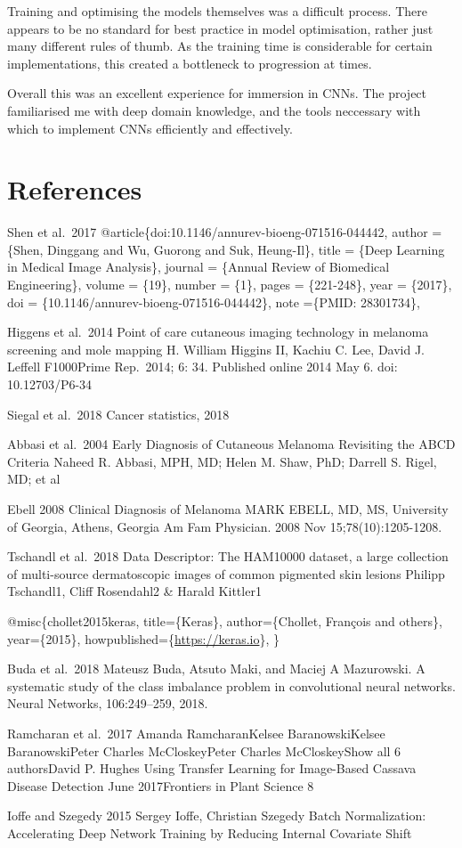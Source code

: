 \documentclass[11pt]{article}
\begin{document}
Training and optimising the models themselves was a difficult process.
There appears to be no standard for best practice in model optimisation,
rather just many different rules of thumb. As the training time is
considerable for certain implementations, this created a bottleneck to
progression at times.

Overall this was an excellent experience for immersion in CNNs. The
project familiarised me with deep domain knowledge, and the tools
neccessary with which to implement CNNs efficiently and effectively.

    \hypertarget{references}{%
\section{References}\label{references}}

Shen et al.~2017 @article\{doi:10.1146/annurev-bioeng-071516-044442,
author = \{Shen, Dinggang and Wu, Guorong and Suk, Heung-Il\}, title =
\{Deep Learning in Medical Image Analysis\}, journal = \{Annual Review
of Biomedical Engineering\}, volume = \{19\}, number = \{1\}, pages =
\{221-248\}, year = \{2017\}, doi =
\{10.1146/annurev-bioeng-071516-044442\}, note =\{PMID: 28301734\},

Higgens et al.~2014 Point of care cutaneous imaging technology in
melanoma screening and mole mapping H. William Higgins II, Kachiu C.
Lee, David J. Leffell F1000Prime Rep.~2014; 6: 34. Published online 2014
May 6. doi: 10.12703/P6-34

Siegal et al.~2018 Cancer statistics, 2018

Abbasi et al.~2004 Early Diagnosis of Cutaneous Melanoma Revisiting the
ABCD Criteria Naheed R. Abbasi, MPH, MD; Helen M. Shaw, PhD; Darrell S.
Rigel, MD; et al

Ebell 2008 Clinical Diagnosis of Melanoma MARK EBELL, MD, MS, University
of Georgia, Athens, Georgia Am Fam Physician. 2008 Nov
15;78(10):1205-1208.

Tschandl et al.~2018 Data Descriptor: The HAM10000 dataset, a large
collection of multi-source dermatoscopic images of common pigmented skin
lesions Philipp Tschandl1, Cliff Rosendahl2 \& Harald Kittler1

@misc\{chollet2015keras, title=\{Keras\}, author=\{Chollet, Fran\c{c}ois
and others\}, year=\{2015\}, howpublished=\{\url{https://keras.io}\}, \}

Buda et al.~2018 Mateusz Buda, Atsuto Maki, and Maciej A Mazurowski. A
systematic study of the class imbalance problem in convolutional neural
networks. Neural Networks, 106:249--259, 2018.

Ramcharan et al.~2017 Amanda RamcharanKelsee BaranowskiKelsee
BaranowskiPeter Charles McCloskeyPeter Charles McCloskeyShow all 6
authorsDavid P. Hughes Using Transfer Learning for Image-Based Cassava
Disease Detection June 2017Frontiers in Plant Science 8

Ioffe and Szegedy 2015 Sergey Ioffe, Christian Szegedy Batch
Normalization: Accelerating Deep Network Training by Reducing Internal
Covariate Shift


    
    
    
    
\end{document}

